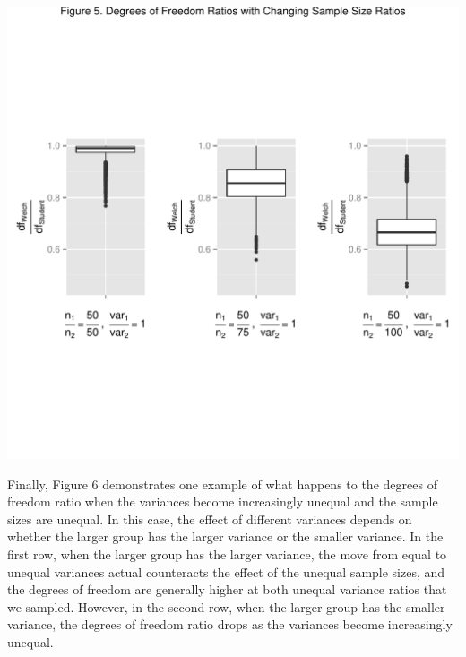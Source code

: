 \documentclass[man,a4paper,noextraspace]{apa6}\usepackage[]{graphicx}\usepackage[]{color}
\makeatletter
\def\maxwidth{ %
  \ifdim\Gin@nat@width>\linewidth
    \linewidth
  \else
    \Gin@nat@width
  \fi
}
\newenvironment{knitrout}{}{} %
\makeatother
\begin{document}
\begin{knitrout}
\color{fgcolor}
\includegraphics[width=\maxwidth]{figure/dfratiosDiffNratios} 

\end{knitrout}

    Finally, Figure 6 demonstrates one example of what happens to the degrees of freedom ratio when the variances become increasingly unequal and the sample sizes are unequal. In this case, the effect of different variances depends on whether the larger group has the larger variance or the smaller variance. In the first row, when the larger group has the larger variance, the move from equal to unequal variances actual counteracts the effect of the unequal sample sizes, and the degrees of freedom are generally higher at both unequal variance ratios that we sampled. However, in the second row, when the larger group has the smaller variance, the degrees of freedom ratio drops as the variances become increasingly unequal. 
\end{document}
